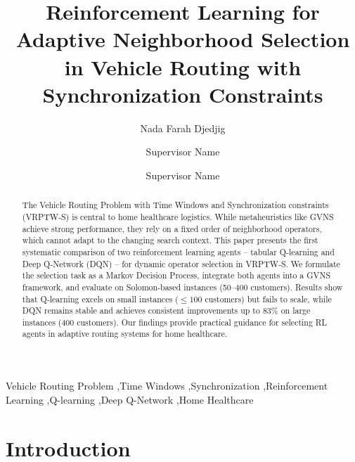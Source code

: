 \documentclass[final,11pt,times]{elsarticle}
\begin{document}
\begin{frontmatter}

\title{Reinforcement Learning for Adaptive Neighborhood Selection in Vehicle Routing with Synchronization Constraints}

\author[label1]{Nada Farah Djedjig}

\author[label1]{Supervisor Name}

\author[label1]{Supervisor Name}

\address[labela]{First affiliation, Address, City and Postcode, Country}
\address[labelb]{Second affiliation, Address, City and Postcode, Country}

\begin{abstract}
The Vehicle Routing Problem with Time Windows and Synchronization constraints (VRPTW‑S) is central to home healthcare logistics. While metaheuristics like GVNS achieve strong performance, they rely on a fixed order of neighborhood operators, which cannot adapt to the changing search context. This paper presents the first systematic comparison of two reinforcement learning agents – tabular Q‑learning and Deep Q‑Network (DQN) – for dynamic operator selection in VRPTW‑S. We formulate the selection task as a Markov Decision Process, integrate both agents into a GVNS framework, and evaluate on Solomon‑based instances (50–400 customers). Results show that Q‑learning excels on small instances ($\leq 100$ customers) but fails to scale, while DQN remains stable and achieves consistent improvements up to 83\% on large instances (400 customers). Our findings provide practical guidance for selecting RL agents in adaptive routing systems for home healthcare.
\end{abstract}

\begin{keyword}
Vehicle Routing Problem \sep Time Windows \sep Synchronization \sep Reinforcement Learning \sep Q-learning \sep Deep Q-Network \sep Home Healthcare
\end{keyword}

\end{frontmatter}
\thispagestyle{fancy}

\section{Introduction}
\label{sec:intro}
\end{document}

